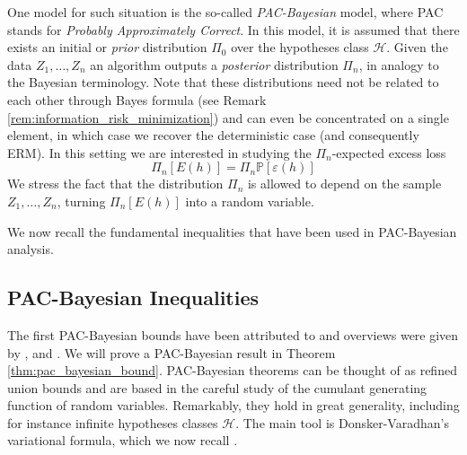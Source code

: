\documentclass{uvamath}
\newcommand*{\calH}{\mathcal{H}}
\newcommand*{\bbP}{\mathbb{P}}
\theoremstyle{remark}
\theoremstyle{definition}
\theoremstyle{definition}
\theoremstyle{definition}
\theoremstyle{definition}
\theoremstyle{definition}
\begin{document}
One model for such situation is the so-called \textit{PAC-Bayesian}
model, where PAC stands for \textit{Probably Approximately
  Correct}. In this model, it is assumed that there exists an initial
or \textit{prior} distribution $\Pi_0$ over the hypotheses class
$\calH$. Given the data $Z_1,\dots,Z_n$ an algorithm outputs a
\textit{posterior} distribution $\Pi_n$, in analogy to the Bayesian
terminology. Note that these distributions need not be related to each
other through Bayes formula (see Remark
\ref{rem:information_risk_minimization}) and can even be concentrated
on a single element, in which case we recover the deterministic case
(and consequently ERM). In this setting we are interested in studying
the $\Pi_n$-expected excess loss
\begin{equation*}
  \Pi_n[E(h)] = \Pi_n\bbP[\varepsilon(h)]
\end{equation*}
We stress the fact that the distribution $\Pi_n$ is allowed to depend
on the sample $Z_1,\dots,Z_n$, turning $\Pi_n[E(h)]$ into a random
variable.

We now recall the fundamental inequalities that have been used in
PAC-Bayesian analysis.

\subsection{PAC-Bayesian
  Inequalities \label{sect:rates_pac_bayesian}}

The first PAC-Bayesian bounds have been attributed to
\citet{mcallester_pac-bayesian_1998} and overviews were given by
\citet{mcallester_pac-bayesian_2013}, \citet{audibert_theorie_2004}
and \citet{van_erven_pac-bayes_2014}. We will prove a PAC-Bayesian
result in Theorem \ref{thm:pac_bayesian_bound}.  PAC-Bayesian theorems
can be thought of as refined union bounds and are based in the careful
study of the cumulant generating function of random
variables. Remarkably, they hold in great generality, including for
instance infinite hypotheses classes $\calH$. The main tool is
Donsker-Varadhan's variational formula, which we now recall
\citep[see][Corollary 4.14]{boucheron_concentration_2013}.
\end{document}
